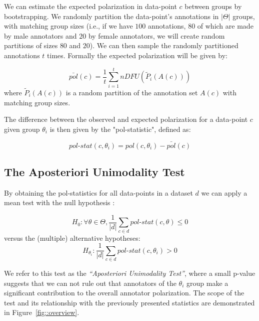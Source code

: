\documentclass{article}
\begin{document}
 We can estimate the expected polarization in data-point $c$ between groups by bootstrapping. We randomly partition the data-point's annotations in $\lvert \Theta \rvert$ groups, with matching group sizes (i.e., if we have $100$ annotations, $80$ of which are made by male annotators and $20$ by female annotators, we will create random partitions of sizes $80$ and $20$). We can then sample the randomly partitioned annotations $t$ times. Formally the expected polarization will be given by:
 
 \begin{equation}
 	\label{eq:pol_expected}
 	\bar{pol}(c) = \frac{1}{t} \sum_{i=1}^t  \textit{nDFU}(\tilde{P}_i(A(c)))
 \end{equation}
 \noindent where $\tilde{P}_i(A(c))$ is a random partition of the annotation set $A(c)$ with matching group sizes.
 
 The difference between the observed and expected polarization for a data-point $c$ given group $\theta_i$ is then given by the "pol-statistic", defined as: 

 \begin{equation}
	\textit{pol-stat}(c, \theta_i)  = pol(c, \theta_i) - \bar{pol}(c)
\end{equation}



\subsection{The Aposteriori Unimodality Test}
\label{ssec:methodology:aposteriori}

By obtaining the pol-statistics for all data-points in a dataset $d$ we can apply a mean test with the null hypothesis :

\begin{equation}
	\label{eq:null_h}
	H_0: \forall \theta \in \Theta, \frac{1}{\lvert d \rvert} \sum\limits_{c \in d} \textit{pol-stat}(c, \theta) \le 0
\end{equation}
\noindent versus the (multiple) alternative hypotheses: 
\begin{equation}
	\label{eq:alt_h}
	H_{\theta_i}:\frac{1}{\lvert d \rvert} \sum\limits_{c \in d} \textit{pol-stat}(c, \theta_i) >  0
\end{equation}

We refer to this test as the \textit{``Aposteriori Unimodality Test''}, where a small p-value suggests that we can not rule out that annotators of the $\theta_i$ group make a significant contribution to the overall annotator polarization. The scope of the test and its relationship with the previously presented statistics are demonstrated in Figure~\ref{fig::overview}.
\end{document}

